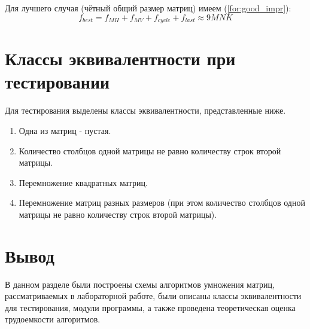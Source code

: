 Для лучшего случая (чётный общий размер матриц) имеем (\ref{for:good_impr}):
\begin{equation}
	\label{for:good_impr}
	f_{best} = f_{MH} + f_{MV} + f_{cycle} + f_{last} \approx 9MNK
\end{equation}


\section{Классы эквивалентности при тестировании}

Для тестирования выделены классы эквивалентности, представленные ниже.

\begin{enumerate}
	\item Одна из матриц - пустая.
	\item Количество столбцов одной матрицы не равно количеству строк второй матрицы.
	\item Перемножение квадратных матриц.
	\item Перемножение матриц разных размеров (при этом количество столбцов одной матрицы не равно количеству строк второй матрицы).
\end{enumerate}


\section{Вывод}

В данном разделе были построены схемы алгоритмов умножения матриц, рассматриваемых в лабораторной работе, были описаны классы эквивалентности для тестирования, модули программы, а также проведена теоретическая оценка трудоемкости алгоритмов.
